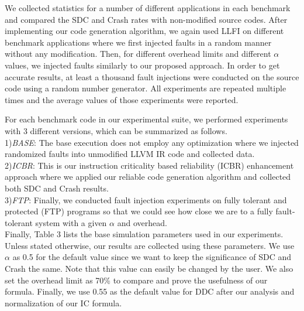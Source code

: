 We collected statistics for a number of different applications in each benchmark and compared the SDC and Crash rates with non-modified source codes. After implementing our code generation algorithm, we again used LLFI \cite{LLFI:2015} on different benchmark applications where we first injected faults in a random manner without any modification. Then, for different overhead limits and different $\alpha$ values, we injected faults similarly to our proposed approach. In order to get accurate results, at least a thousand fault injections were conducted on the source code using a random number generator. All experiments are repeated multiple times and the average values of those experiments were reported. 

For each benchmark code in our experimental suite, we performed experiments with 3 different versions, which can be summarized as follows.\\
1)\emph{BASE}: The base execution does not employ any optimization where we injected randomized faults into unmodified LLVM IR code and collected data. \\
2)\emph{ICBR}: This is our instruction criticality based reliability (ICBR) enhancement approach where we applied our reliable code generation algorithm and collected both SDC and Crash results. \\
3)\emph{FTP}: Finally, we conducted fault injection experiments on fully tolerant and protected (FTP) programs so that we could see how close we are to a fully fault-tolerant system with a given $\alpha$ and overhead.\\

Finally, Table 3 lists the base simulation parameters used in our experiments. Unless stated otherwise, our results are collected using these parameters. We use $\alpha$ as 0.5 for the default value since we want to keep the significance of SDC and Crash the same. Note that this value can easily be changed by the user. We also set the overhead limit as 70\% to compare and prove the usefulness of our formula. Finally, we use 0.55 as the default value for DDC after our analysis and normalization of our IC formula. 


